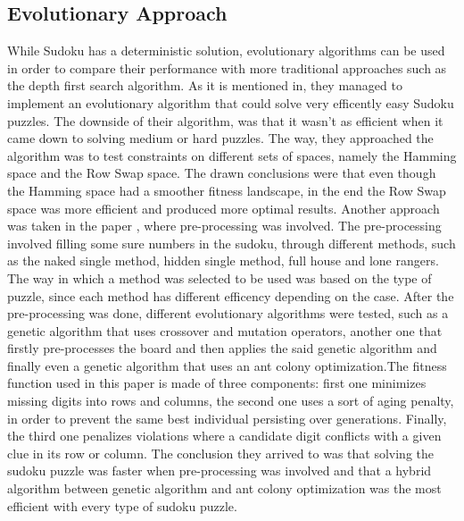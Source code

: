 \subsection{Evolutionary Approach}
{While Sudoku has a deterministic solution, evolutionary algorithms can be used in order to compare their performance with more traditional approaches such as the depth first search algorithm. As it is mentioned in\cite{Moraglio}, they managed to implement an evolutionary algorithm that could solve very efficently easy Sudoku puzzles. The downside of their algorithm, was that it wasn't as efficient when it came down to solving medium or hard puzzles.
The way, they approached the algorithm \cite{Moraglio} was to test constraints on different sets of spaces, namely the Hamming space and the Row Swap space. The drawn conclusions were that even though the Hamming space had a smoother fitness landscape, in the end the Row Swap space was more efficient and produced more optimal results.}
{\newline}
{\newline Another approach was taken in the paper \cite{Amil2019}, where pre-processing was involved. The pre-processing involved filling some sure numbers in the sudoku, through different methods, such as the naked single method, hidden single method, full house and lone rangers. The way in which a method was selected to be used was based on the type of puzzle, since each method has different efficency depending on the case.
After the pre-processing was done, different evolutionary algorithms were tested, such as a genetic algorithm that uses crossover and mutation operators, another one that firstly pre-processes the board and then applies the said genetic algorithm and finally even a genetic algorithm that uses an ant colony optimization.The fitness function used in this paper is made of three components: first one minimizes missing digits into rows and columns, the second one uses a sort of aging penalty, in order to prevent the same best individual persisting over generations. Finally, the third one penalizes violations where a candidate digit conflicts with a given clue in its row or column.
The conclusion they arrived to was that solving the sudoku puzzle was faster when pre-processing was involved and that a hybrid algorithm between genetic algorithm and ant colony optimization was the most efficient with every type of sudoku puzzle.  }
{\newline}
